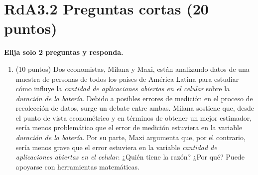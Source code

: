 \documentclass[10pt,a4paper]{article}
\begin{document}
\section{RdA3.2  Preguntas cortas (20 puntos)}
{\bf Elija solo 2 preguntas y responda. }
\begin{enumerate}
    \item (10 puntos) Dos economistas, Milana y Maxi, están analizando datos de una muestra de personas de todos los países de América Latina para estudiar cómo influye la \textit{cantidad de aplicaciones abiertas en el celular} sobre la \textit{duración de la batería}. 
    Debido a posibles errores de medición en el proceso de recolección de datos, surge un debate entre ambas. Milana sostiene que, desde el punto de vista econométrico y en términos de obtener un mejor estimador, sería menos problemático que el error de medición estuviera en la variable \textit{duración de la batería}. Por su parte, Maxi argumenta que, por el contrario, sería menos grave que el error estuviera en la variable \textit{cantidad de aplicaciones abiertas en el celular}. ¿Quién tiene la razón? ¿Por qué? Puede apoyarse con herramientas matemáticas.

\end{enumerate}
\end{document}
